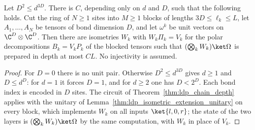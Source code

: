 \begin{lemma}
    \label{thm:ldp_isometric_extension_depth}
    \leanok
    Let $D^2\le d^{3D}$. There is $C$, depending only on $d$ and $D$, such that
    the following holds. Cut the ring of $N\ge1$ sites into $M\ge1$ blocks of lengths
    $3D\le\ell_k\le L$, let $A_1,\dots,A_N$ be tensors of bond dimension $D$,
    and let $\omega^k$ be unit vectors on $\C^D\otimes\C^D$. Then there are
    isometries $W_k$ with $W_k\Pi_k=V_k$ for the polar decompositions
    $B_k=V_kP_k$ of the blocked tensors such that
    $(\bigotimes_kW_k)\ket\Omega$ is prepared in depth at most $CL$. No
    injectivity is assumed.
\end{lemma}
\begin{proof}
    \leanok
    For $D=0$ there is no unit pair. Otherwise $D^2\le d^{3D}$ gives $d\ge1$ and
    $D\le d^D$: for $d=1$ it forces $D=1$, and for $d\ge2$ one has $D<2^D$.
    Each bond index is encoded in $D$ sites. The circuit of
    Theorem~\ref{thm:ldp_chain_depth} applies with the unitary of
    Lemma~\ref{thm:ldp_isometric_extension_unitary} on every block, which
    implements $W_k$ on all inputs $\ket{l,0,r}$; the state of the two layers
    is $(\bigotimes_kW_k)\ket\Omega$ by the same computation, with $W_k$ in
    place of $V_k$.
\end{proof}

